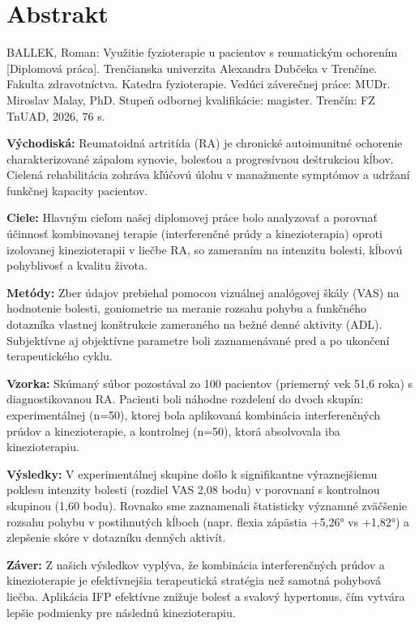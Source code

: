 
\chapter*{Abstrakt}

BALLEK, Roman: Využitie fyzioterapie u pacientov s reumatickým ochorením [Diplomová práca]. Trenčianska univerzita Alexandra Dubčeka v Trenčíne. Fakulta zdravotníctva. Katedra fyzioterapie. Vedúci záverečnej práce: MUDr. Miroslav Malay, PhD. Stupeň odbornej kvalifikácie: magister. Trenčín: FZ TnUAD, 2026, 76 s.

\textbf{Východiská:} Reumatoidná artritída (RA) je chronické autoimunitné ochorenie charakterizované zápalom synovie, bolesťou a progresívnou deštrukciou kĺbov. Cielená rehabilitácia zohráva kľúčovú úlohu v manažmente symptómov a udržaní funkčnej kapacity pacientov.

\textbf{Ciele:} Hlavným cieľom našej diplomovej práce bolo analyzovať a porovnať účinnosť kombinovanej terapie (interferenčné prúdy a kinezioterapia) oproti izolovanej kinezioterapii v liečbe RA, so zameraním na intenzitu bolesti, kĺbovú pohyblivosť a kvalitu života.

\textbf{Metódy:} Zber údajov prebiehal pomocou vizuálnej analógovej škály (VAS) na hodnotenie bolesti, goniometrie na meranie rozsahu pohybu a funkčného dotazníka vlastnej konštrukcie zameraného na bežné denné aktivity (ADL). Subjektívne aj objektívne parametre boli zaznamenávané pred a po ukončení terapeutického cyklu.

\textbf{Vzorka:} Skúmaný súbor pozostával zo 100 pacientov (priemerný vek 51,6 roka) s diagnostikovanou RA. Pacienti boli náhodne rozdelení do dvoch skupín: experimentálnej (n=50), ktorej bola aplikovaná kombinácia interferenčných prúdov a kinezioterapie, a kontrolnej (n=50), ktorá absolvovala iba kinezioterapiu.

\textbf{Výsledky:} V experimentálnej skupine došlo k signifikantne výraznejšiemu poklesu intenzity bolesti (rozdiel VAS 2,08 bodu) v porovnaní s kontrolnou skupinou (1,60 bodu). Rovnako sme zaznamenali štatisticky významné zväčšenie rozsahu pohybu v postihnutých kĺboch (napr. flexia zápästia +5,26° vs +1,82°) a zlepšenie skóre v dotazníku denných aktivít.

\textbf{Záver:} Z našich výsledkov vyplýva, že kombinácia interferenčných prúdov a kinezioterapie je efektívnejšia terapeutická stratégia než samotná pohybová liečba. Aplikácia IFP efektívne znižuje bolesť a svalový hypertonus, čím vytvára lepšie podmienky pre následnú kinezioterapiu.

